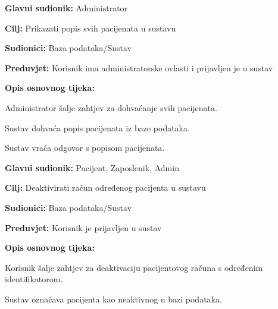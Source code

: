                 \noindent {}
					\begin{packed_item}
	
						\item \textbf{Glavni sudionik: }Administrator
						\item  \textbf{Cilj:} Prikazati popis svih pacijenata u sustavu
						\item  \textbf{Sudionici:} Baza podataka/Sustav
						\item  \textbf{Preduvjet:} Korisnik ima administratorske ovlasti i prijavljen je u sustav
						\item  \textbf{Opis osnovnog tijeka:}
						
						\item[] \begin{packed_enum}
	
							\item Administrator šalje zahtjev za dohvaćanje svih pacijenata.
							\item Sustav dohvaća popis pacijenata iz baze podataka.
                            \item Sustav vraća odgovor s popisom pacijenata.
	
						\end{packed_enum}
						
						
					\end{packed_item}

                \noindent {}
					\begin{packed_item}
	
						\item \textbf{Glavni sudionik: }Pacijent, Zaposlenik, Admin
						\item  \textbf{Cilj:} Deaktivirati račun određenog pacijenta u sustavu
						\item  \textbf{Sudionici:} Baza podataka/Sustav
						\item  \textbf{Preduvjet:} Korisnik je prijavljen u sustav
						\item  \textbf{Opis osnovnog tijeka:}
						
						\item[] \begin{packed_enum}
	
							\item Korisnik šalje zahtjev za deaktivaciju pacijentovog računa s određenim identifikatorom.
							\item Sustav označava pacijenta kao neaktivnog u bazi podataka.
	
						\end{packed_enum}
						
						
					\end{packed_item}


